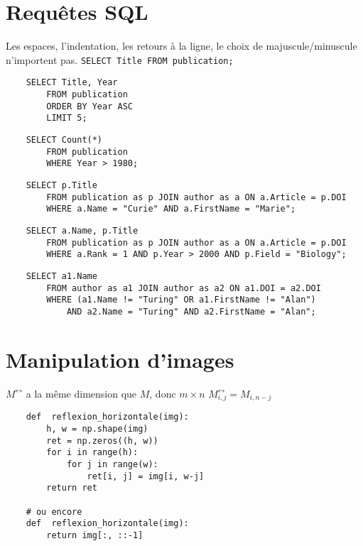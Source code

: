 
\section*{Requêtes SQL}
\ques Les espaces, l'indentation, les retours à la ligne, le choix de majuscule/minuscule n'importent pas.
\ssques \texttt{SELECT Title FROM publication;}
\ssques \begin{verbatim}
    SELECT Title, Year
        FROM publication
        ORDER BY Year ASC
        LIMIT 5;
\end{verbatim}
\ssques \begin{verbatim}
    SELECT Count(*)
        FROM publication
        WHERE Year > 1980;
\end{verbatim}

\ssques \begin{verbatim}
    SELECT p.Title
        FROM publication as p JOIN author as a ON a.Article = p.DOI
        WHERE a.Name = "Curie" AND a.FirstName = "Marie";
\end{verbatim}

\ssques \begin{verbatim}
    SELECT a.Name, p.Title
        FROM publication as p JOIN author as a ON a.Article = p.DOI
        WHERE a.Rank = 1 AND p.Year > 2000 AND p.Field = "Biology";
\end{verbatim}

\ssques \begin{verbatim}
    SELECT a1.Name
        FROM author as a1 JOIN author as a2 ON a1.DOI = a2.DOI
        WHERE (a1.Name != "Turing" OR a1.FirstName != "Alan")
            AND a2.Name = "Turing" AND a2.FirstName = "Alan";
\end{verbatim}

\section*{Manipulation d'images}

\ques
\ssques $ M^{\leftrightarrow} $ a la même dimension que $ M $, donc $ m \times n $
\ssques $ M^{\leftrightarrow}_{i,j} = M_{i, n-j} $
\ssques \begin{verbatim}
    def  reflexion_horizontale(img):
        h, w = np.shape(img)
        ret = np.zeros((h, w))
        for i in range(h):
            for j in range(w):
                ret[i, j] = img[i, w-j]
        return ret

    # ou encore
    def  reflexion_horizontale(img):
        return img[:, ::-1]
\end{verbatim}

